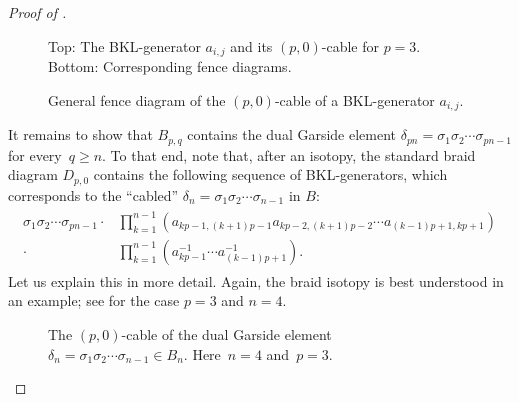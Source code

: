 \documentclass{amsart}
\theoremstyle{definition}
\theoremstyle{remark}
\theoremstyle{plain}
\newcommand{\sigij}{a_{i,j}}
\begin{document}
\begin{proof}[{Proof of }]
    \begin{figure}[htbp] 
        \centering
        \def\svgwidth{1\columnwidth}
	        
        \caption{Top: The BKL-generator $\sigij$ and its $(p,0)$-cable for $p=3$. Bottom: Corresponding fence diagrams.}
        \label{fig:cabling_BKL-gen}
    \end{figure}

    \begin{figure}[htbp] 
        \centering
        \def\svgwidth{0.5\columnwidth}
	        
        \caption{General fence diagram of the $(p,0)$-cable of a BKL-generator $\sigij$.}
        \label{fig:cabling_BKL-gen_fence}
    \end{figure}

    It remains to show that $B_{p,q}$ contains the dual Garside element $\delta_{pn} = \sigma_1 \sigma_2 \cdots \sigma_{pn-1}$ for every~$q \geq n$. To that end, note that, after an isotopy, the standard braid diagram $D_{p,0}$ contains the following sequence of BKL-generators, which corresponds to the ``cabled'' $\delta_n = \sigma_1 \sigma_2 \cdots \sigma_{n-1}$ in $B$:
    \begin{align}\label{eq:cabled_delta}
        \begin{split}
            \sigma_1 \sigma_2 \cdots \sigma_{pn-1} \cdot
            &\prod_{k=1}^{n-1} \left( a_{kp-1,(k+1)p-1} a_{kp-2,(k+1)p-2} \cdots a_{(k-1)p+1,kp+1} \right)\\
            \cdot &\prod_{k=1}^{n-1} \left(a_{kp-1}^{-1} \cdots a_{(k-1)p+1}^{-1} \right).
        \end{split}
    \end{align}
    Let us explain this in more detail. Again, the braid isotopy is best understood in an example; see  for the case $p=3$ and $n=4$.

    \begin{figure}[htbp] 
          \centering
     \def\svgwidth{1\columnwidth}
	  
        \caption{The $(p,0)$-cable of the dual Garside element $\delta_n = \sigma_1 \sigma_2 \cdots \sigma_{n-1} \in B_n$. Here~$n=4$ and~$p=3$. 
        }
        \label{fig:cabling_delta}
    \end{figure}
    

\end{proof}
\end{document}
